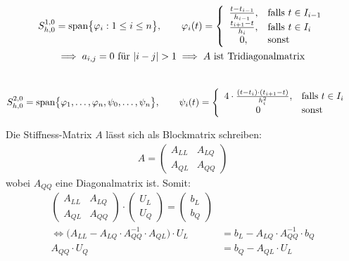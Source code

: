 \begin{align*}
S^{1,0}_{h,0}&=\text{span}\big\lbrace\varphi_i:1\leq i\leq n\big\rbrace,\qquad
\varphi_i(t)=\left\lbrace\begin{array}{cl}
\frac{t-t_{i-1}}{h_{i-1}}, &\falls t\in I_{i-1}\\
\frac{t_{i+1}-t}{h_i}, &\falls t\in I_i\\
0, &\sonst
\end{array}\right.\\
&\implies a_{i,j}=0\text{ für }|i-j|>1\implies A\text{ ist Tridiagonalmatrix}
\end{align*}
\\
\begin{align*}
S_{h,0}^{2,0}&=\text{span}\big\lbrace\varphi_1,\ldots,\varphi_n,\psi_0,\ldots,\psi_n\big\rbrace,\qquad
\psi_i(t)=\left\lbrace\begin{array}{cl}
4\cdot\frac{(t-t_i)\cdot(t_{i+1}-t)}{h_i^2}, &\text{falls } t\in I_i\\
0 &\text{sonst }
\end{array}\right.
\end{align*}

Die Stiffness-Matrix $A$ lässt sich als Blockmatrix schreiben:
\begin{align*}
A=\begin{pmatrix}
A_{LL} & A_{LQ}\\
A_{QL} & A_{QQ}
\end{pmatrix}
\end{align*}
wobei $A_{QQ}$ eine Diagonalmatrix ist. Somit:
\begin{align*}
\begin{pmatrix}
A_{LL} & A_{LQ}\\
A_{QL} & A_{QQ}
\end{pmatrix}\cdot\begin{pmatrix}
U_L\\ U_Q
\end{pmatrix}=
\begin{pmatrix}
b_L\\ b_Q
\end{pmatrix}\\
\Longleftrightarrow \big(A_{LL}-A_{LQ}\cdot A^{-1}_{QQ}\cdot A_{QL}\big)\cdot U_L&= b_L-A_{LQ}\cdot A^{-1}_{QQ}\cdot b_Q\\
A_{QQ}\cdot U_Q&= b_Q-A_{QL}\cdot U_L
\end{align*}

